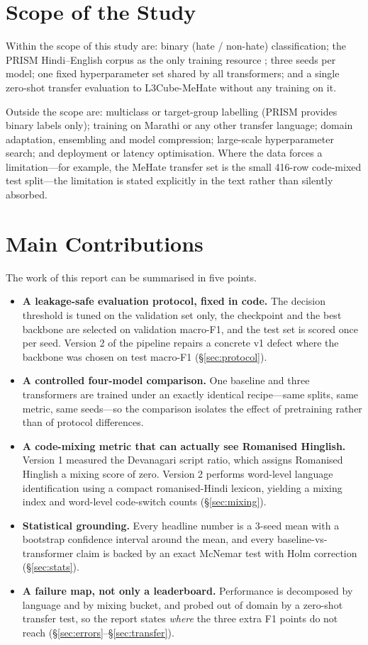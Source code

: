 \section{Scope of the Study}
\label{sec:scope}

Within the scope of this study are: binary (hate / non-hate) classification;
the PRISM Hindi--English corpus as the only training resource \cite{prism}; three
seeds per model; one fixed hyperparameter set shared by all transformers; and a
single zero-shot transfer evaluation to L3Cube-MeHate \cite{mehate} without any
training on it.

Outside the scope are: multiclass or target-group labelling (PRISM provides binary
labels only); training on Marathi or any other transfer language; domain
adaptation, ensembling and model compression; large-scale hyperparameter search;
and deployment or latency optimisation. Where the data forces a limitation---for
example, the MeHate transfer set is the small 416-row code-mixed test split---the
limitation is stated explicitly in the text rather than silently absorbed.

\section{Main Contributions}
\label{sec:contrib}

The work of this report can be summarised in five points.

\begin{itemize}
\item \textbf{A leakage-safe evaluation protocol, fixed in code.} The decision
threshold is tuned on the validation set only, the checkpoint and the best backbone
are selected on validation macro-F1, and the test set is scored once per seed.
Version 2 of the pipeline repairs a concrete v1 defect where the backbone was
chosen on test macro-F1 (\S\ref{sec:protocol}).
\item \textbf{A controlled four-model comparison.} One baseline and three
transformers are trained under an exactly identical recipe---same splits, same
metric, same seeds---so the comparison isolates the effect of pretraining rather
than of protocol differences.
\item \textbf{A code-mixing metric that can actually see Romanised Hinglish.}
Version 1 measured the Devanagari script ratio, which assigns Romanised Hinglish a
mixing score of zero. Version 2 performs word-level language identification using
a compact romanised-Hindi lexicon, yielding a mixing index and word-level
code-switch counts (\S\ref{sec:mixing}).
\item \textbf{Statistical grounding.} Every headline number is a 3-seed mean with
a bootstrap confidence interval around the mean, and every baseline-vs-transformer
claim is backed by an exact McNemar test with Holm correction
(\S\ref{sec:stats}).
\item \textbf{A failure map, not only a leaderboard.} Performance is decomposed by
language and by mixing bucket, and probed out of domain by a zero-shot transfer
test, so the report states \emph{where} the three extra F1 points do not reach
(\S\ref{sec:errors}--\S\ref{sec:transfer}).
\end{itemize}

